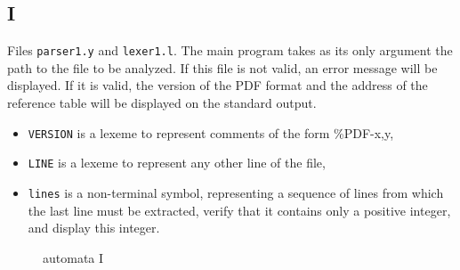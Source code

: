 \documentclass{article}
\begin{document}
\subsection*{I}

\begin{flushleft}
    \hspace{1cm} Files \texttt{parser1.y} and \texttt{lexer1.l}.
The main program takes as its only argument the path to the file to be analyzed. If this file is not valid, an error message will be displayed. If it is valid, the version of the PDF format and the address of the reference table will be displayed on the standard output.

\begin{itemize}
    \item \texttt{VERSION} is a lexeme to represent comments of the form \%PDF-x,y,
    \item \texttt{LINE} is a lexeme to represent any other line of the file,
    \item \texttt{lines} is a non-terminal symbol, representing a sequence of lines from which the last line must be extracted, verify that it contains only a positive integer, and display this integer.
\end{itemize}

\end{flushleft}

\begin{figure}[H]
    \centering
    \caption{automata I}
\end{figure}
\end{document}
